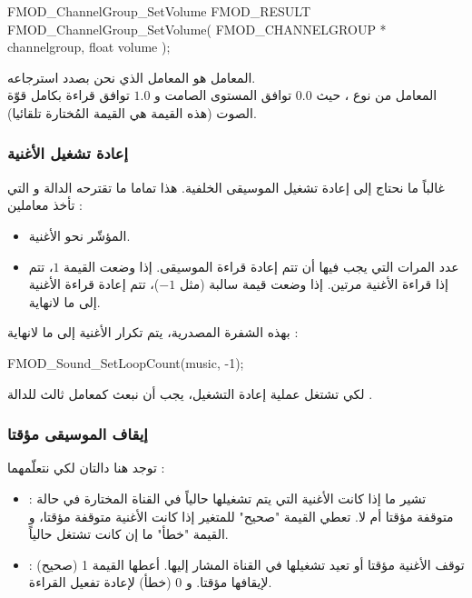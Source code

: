 \begin{Csource}
FMOD_ChannelGroup_SetVolume 
FMOD_RESULT FMOD_ChannelGroup_SetVolume(
	FMOD_CHANNELGROUP *  channelgroup,  float  volume
);
\end{Csource}

المعامل
هو المعامل الذي نحن بصدد استرجاعه.\\
المعامل
من نوع
،
حيث $ 0.0 $ توافق المستوى الصامت و $ 1.0  $ توافق قراءة بكامل قوّة الصوت (هذه القيمة هي القيمة المُختارة تلقائيا).

\subsubsection{إعادة تشغيل الأغنية}

غالباً ما نحتاج إلى إعادة تشغيل الموسيقى الخلفية. هذا تماما ما تقترحه الدالة
و التي تأخذ معاملين :

\begin{itemize}
	\item المؤشّر نحو الأغنية.
	\item عدد المرات التي يجب فيها أن تتم إعادة قراءة الموسيقى. إذا وضعت القيمة $ 1 $، تتم إذا قراءة الأغنية مرتين. إذا وضعت قيمة سالبة (مثل $ -1 $)، تتم إعادة قراءة الأغنية إلى ما لانهاية.
\end{itemize}

بهذه الشفرة المصدرية، يتم تكرار الأغنية إلى ما لانهاية : 

\begin{Csource}
FMOD_Sound_SetLoopCount(music, -1);
\end{Csource}

\begin{critical}
 لكي تشتغل عملية إعادة التشغيل، يجب أن نبعث 
 كمعامل ثالث للدالة
.
\end{critical}

\subsubsection{إيقاف الموسيقى مؤقتا}

توجد هنا دالتان لكي نتعلّمهما :

\begin{itemize}
	\item {} :
	تشير ما إذا كانت الأغنية التي يتم تشغيلها حالياً في القناة المختارة في حالة متوقفة مؤقتا أم لا. تعطي القيمة "صحيح" للمتغير 
	إذا كانت الأغنية متوقفة مؤقتا، و القيمة "خطأ" ما إن كانت تشتغل حالياً.
	\item {} :
	توقف الأغنية مؤقتا أو تعيد تشغيلها في القناة المشار إليها. أعطها القيمة 1 (صحيح) لإيقافها مؤقتا. و 0 (خطأ) لإعادة تفعيل القراءة.
\end{itemize}

